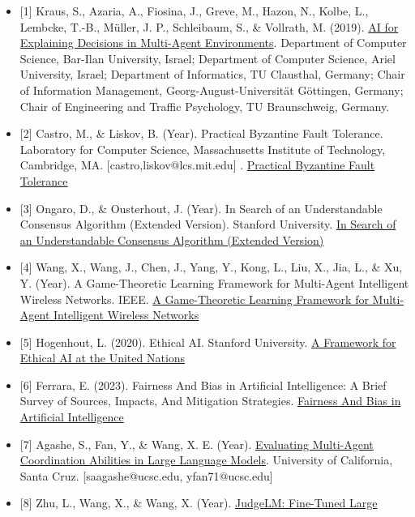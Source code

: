 \begin{itemize}
\item
  {[}1{]} Kraus, S., Azaria, A., Fiosina, J., Greve, M., Hazon, N.,
  Kolbe, L., Lembcke, T.-B., Müller, J. P., Schleibaum, S., \& Vollrath,
  M. (2019). \href{https://arxiv.org/pdf/1910.04404.pdf}{AI for
  Explaining Decisions in Multi-Agent Environments}. Department of
  Computer Science, Bar-Ilan University, Israel; Department of Computer
  Science, Ariel University, Israel; Department of Informatics, TU
  Clausthal, Germany; Chair of Information Management,
  Georg-August-Universität Göttingen, Germany; Chair of Engineering and
  Traffic Psychology, TU Braunschweig, Germany.
\item
  {[}2{]} Castro, M., \& Liskov, B. (Year). Practical Byzantine Fault
  Tolerance. Laboratory for Computer Science, Massachusetts Institute of
  Technology, Cambridge, MA. {[}castro,liskov@lcs.mit.edu{]} .
  \href{https://www.scs.stanford.edu/nyu/03sp/sched/bfs.pdf}{Practical
  Byzantine Fault Tolerance}
\item
  {[}3{]} Ongaro, D., \& Ousterhout, J. (Year). In Search of an
  Understandable Consensus Algorithm (Extended Version). Stanford
  University. \href{https://raft.github.io/raft.pdf}{In Search of an
  Understandable Consensus Algorithm (Extended Version)}
\item
  {[}4{]} Wang, X., Wang, J., Chen, J., Yang, Y., Kong, L., Liu, X.,
  Jia, L., \& Xu, Y. (Year). A Game-Theoretic Learning Framework for
  Multi-Agent Intelligent Wireless Networks. IEEE.
  \href{https://arxiv.org/pdf/1812.01267v2.pdf}{A Game-Theoretic
  Learning Framework for Multi-Agent Intelligent Wireless Networks}
\item
  {[}5{]} Hogenhout, L. (2020). Ethical AI. Stanford University.
  \href{https://arxiv.org/pdf/2104.12547.pdf}{A Framework for Ethical AI
  at the United Nations}
\item
  {[}6{]} Ferrara, E. (2023). Fairness And Bias in Artificial
  Intelligence: A Brief Survey of Sources, Impacts, And Mitigation
  Strategies. \href{https://arxiv.org/pdf/2304.07683v1.pdf}{Fairness And
  Bias in Artificial Intelligence}
\item
  {[}7{]} Agashe, S., Fan, Y., \& Wang, X. E. (Year).
  \href{https://arxiv.org/pdf/2310.03903.pdf}{Evaluating Multi-Agent
  Coordination Abilities in Large Language Models}. University of
  California, Santa Cruz. {[}saagashe@ucsc.edu, yfan71@ucsc.edu{]}
\item
  {[}8{]} Zhu, L., Wang, X., \& Wang, X. (Year).
  \href{https://arxiv.org/pdf/2310.17631.pdf}{JudgeLM: Fine-Tuned Large
}
\end{itemize}

